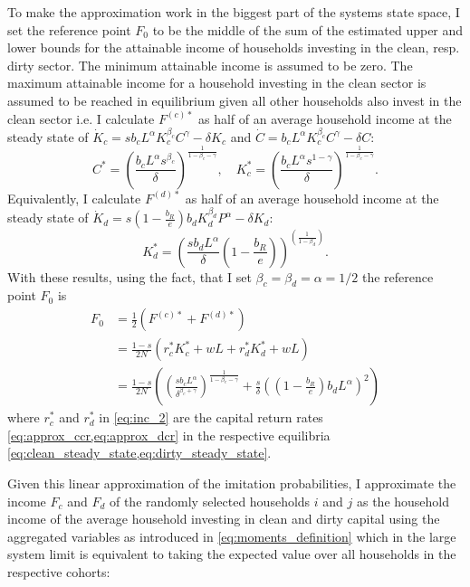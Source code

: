 To make the approximation work in the biggest part of the systems state space, I set the reference point $F_0$ to be the middle of the sum of the estimated upper and lower bounds for the attainable income of households investing in the clean, resp. dirty sector. The minimum attainable income is assumed to be zero. The maximum attainable income for a household investing in the clean sector is assumed to be reached in equilibrium given all other households also invest in the clean sector i.e. I calculate $F^{(c)*}$ as half of an average household income at the steady state of $\dot{K}_c = s b_c L^\alpha K_c^{\beta_c} C^\gamma - \delta K_c$ and $\dot{C} = b_c L^\alpha K_c^{\beta_c} C^\gamma - \delta C$:
\begin{equation}
	C^* = \left( \frac{b_c L^\alpha s^{\beta_c}}{\delta}\right)^{\frac{1}{1-\beta_c-\gamma}}, \quad K_c^* = \left( \frac{b_c L^\alpha s^{1-\gamma}}{\delta}\right)^{\frac{1}{1-\beta_c-\gamma}}.
	\label{eq:clean_steady_state}
\end{equation}
Equivalently, I calculate $F^{(d)*}$ as half of an average household income at the steady state of $ \dot{K}_d = s \left(1 - \frac{b_R}{e} \right) b_d K_d^{\beta_d} P^{\alpha} - \delta K_d $:
\begin{equation}
	K_d^* = \left( \frac{s b_d L^\alpha}{\delta} \left(1 - \frac{b_R}{e} \right)\right)^{\left(\frac{1}{1 - \beta_d} \right)}.
	\label{eq:dirty_steady_state}
\end{equation}
With these results, using the fact, that I set $\beta_c = \beta_d = \alpha = 1/2$ the reference point $F_0$ is
\begin{align}
	F_0 &= \frac{1}{2}\left(F^{(c)*} + F^{(d)*}  \right) \nonumber \\
	&= \frac{1-s}{2N}\left(r_c^* K_c^* + w L + r_d^* K_d^* + w L\right) \label{eq:inc_2}\\
	&= \frac{1-s}{2N}\left( \left( \frac{s b_c L^{\alpha}}{\delta^{\beta_c + \gamma}} \right)^{\frac{1}{1-\beta_c - \gamma}} + \frac{s}{\delta}\left( \left( 1 - \frac{b_R}{e} \right) b_d L^{\alpha} \right)^2 \right)
\end{align}
where $r_c^*$ and $r_d^*$ in \eqref{eq:inc_2} are the capital return rates \cref{eq:approx_ccr,eq:approx_dcr} in the respective equilibria \cref{eq:clean_steady_state,eq:dirty_steady_state}.

Given this linear approximation of the imitation probabilities, I approximate the income $F_c$ and $F_d$ of the randomly selected households $i$ and $j$ as the household income of the average household investing in clean and dirty capital using the aggregated variables as introduced in \eqref{eq:moments_definition} which in the large system limit is equivalent to taking the expected value over all households in the respective cohorts:

